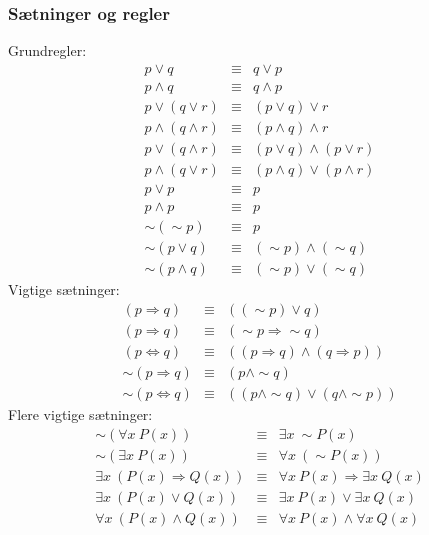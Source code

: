 \documentclass{article}
\begin{document}
    \subsubsection{Sætninger og regler}
      Grundregler:
      \begin{eqnarray}
        p \vee q &\equiv& q \vee p \\
        p \wedge q &\equiv& q \wedge p \\
        p \vee (q \vee r) &\equiv& (p \vee q) \vee r \\
        p \wedge (q \wedge r) &\equiv& (p \wedge q) \wedge r \\
        p \vee (q \wedge r) &\equiv& (p \vee q) \wedge (p \vee r) \\
        p \wedge (q \vee r) &\equiv& (p \wedge q) \vee (p \wedge r) \\
        p \vee p &\equiv& p \\
        p \wedge p &\equiv& p \\
        \sim (\sim p) &\equiv& p \\
        \sim (p \vee q) &\equiv& (\sim p) \wedge (\sim q) \\
        \sim (p \wedge q) &\equiv& (\sim p) \vee (\sim q) 
      \end{eqnarray}
      Vigtige sætninger:
      \begin{eqnarray}
        (p\Rightarrow q) &\equiv& ((\sim p) \vee q) \\
        (p \Rightarrow q) &\equiv& (\sim p \Rightarrow \sim q) \\
        (p \Leftrightarrow q) &\equiv& ((p \Rightarrow q) \wedge (q \Rightarrow p)) \\
        \sim (p \Rightarrow q) &\equiv& (p \wedge \sim q) \\
        \sim (p \Leftrightarrow q) &\equiv& ((p \wedge \sim q) \vee (q \wedge \sim p))
      \end{eqnarray}
      Flere vigtige sætninger:
      \begin{eqnarray}
        \sim (\forall x~P(x)) &\equiv& \exists x~\sim P(x) \\
        \sim (\exists x~P(x)) &\equiv& \forall x~(\sim P(x)) \\
        \exists x~(P(x) \Rightarrow Q(x)) &\equiv& \forall x~P(x) \Rightarrow \exists x~Q(x) \\
        \exists x~(P(x) \vee Q(x)) &\equiv& \exists x~P(x) \vee \exists x~Q(x) \\
        \forall x~(P(x) \wedge Q(x)) &\equiv& \forall x~P(x) \wedge \forall x~Q(x)
      \end{eqnarray}
\end{document}
